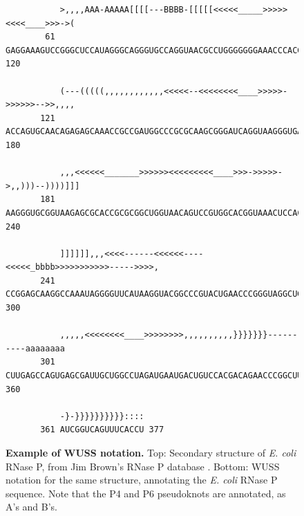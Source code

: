 \begin{figure}[tp]
\begin{center}
{\begin{BVerbatim}
           >,,,,AAA-AAAAA[[[[---BBBB-[[[[[<<<<<_____>>>>><<<<____>>>->(
        61 GAGGAAAGUCCGGGCUCCAUAGGGCAGGGUGCCAGGUAACGCCUGGGGGGGAAACCCACG 120

           (---(((((,,,,,,,,,,,,<<<<<--<<<<<<<<____>>>>>->>>>>>-->>,,,,
       121 ACCAGUGCAACAGAGAGCAAACCGCCGAUGGCCCGCGCAAGCGGGAUCAGGUAAGGGUGA 180

           ,,,<<<<<<_______>>>>>><<<<<<<<<____>>>->>>>>->,,)))--))))]]]
       181 AAGGGUGCGGUAAGAGCGCACCGCGCGGCUGGUAACAGUCCGUGGCACGGUAAACUCCAC 240

           ]]]]]],,,<<<<------<<<<<<----<<<<<_bbbb>>>>>>>>>>>----->>>>,
       241 CCGGAGCAAGGCCAAAUAGGGGUUCAUAAGGUACGGCCCGUACUGAACCCGGGUAGGCUG 300

           ,,,,,<<<<<<<<____>>>>>>>>,,,,,,,,,,}}}}}}}----------aaaaaaaa
       301 CUUGAGCCAGUGAGCGAUUGCUGGCCUAGAUGAAUGACUGUCCACGACAGAACCCGGCUU 360

           -}-}}}}}}}}}}::::
       361 AUCGGUCAGUUUCACCU 377
\end{BVerbatim}
}
\end{center}
\caption{\small \textbf{Example of WUSS notation.} Top: Secondary
structure of \emph{E. coli} RNase P, from Jim Brown's RNase P database
\citep{Brown99}. Bottom: WUSS notation for the same structure,
annotating the \emph{E. coli} RNase P sequence. Note that the P4 and P6
pseudoknots are annotated, as A's and B's.}
\label{fig:RNaseP}
\end{figure}

